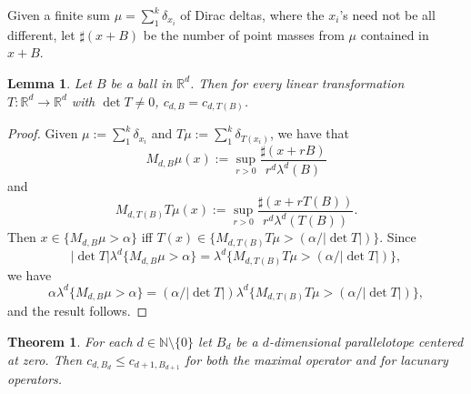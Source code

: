 \documentclass[12pt,a4paper]{amsart}
\theoremstyle{plain}
\newtheorem{thm}{Theorem}
\newtheorem{lem}{Lemma}
\theoremstyle{remark}
\begin{document}
Given a finite sum
$\mu = \sum_1^k \delta_{x_i}$ of Dirac deltas, where
the $x_i$'s need not be all different, let $\sharp (x + B)$ be the number
of point masses from $\mu$ contained in $x + B$.

\begin{lem}
\label{lem:linear}
Let $B$ be a ball in $\mathbb{R}^d$. Then for
every linear transformation $T \colon \mathbb{R}^d \to \mathbb{R}^d$ with
$\det T \ne 0$, $c_{d,B} = c_{d,T(B)}$.
\end{lem}

\begin{proof}
Given $\mu := \sum_1^k \delta_{x_i}$ and
$T \mu := \sum_1^k \delta_{T(x_i)}$, we have that
\[
    M_{d,B} \mu (x) := \sup_{r > 0} \frac{\sharp (x + rB)}{r^d\lambda^d (B)}
\]
and
\[
    M_{d,T(B)} T\mu (x) := \sup_{r > 0}
      \frac{\sharp (x + rT(B))}{r^d\lambda^d (T(B))}.
\]
Then
$x \in \{ M_{d,B} \mu > \alpha \}$
iff
$T(x)\in \{ M_{d,T(B)} T\mu > (\alpha / |\det T|)\}$.
Since
\[
    |\det T| \lambda^d \{ M_{d,B} \mu > \alpha \}
    = \lambda^d \{ M_{d,T(B)} T\mu > (\alpha / |\det T|) \},
\]
we have
\[
    \alpha \lambda^d \{ M_{d,B} \mu > \alpha \}
    = (\alpha / |\det T|) \lambda^d \{ M_{d,T(B)} T\mu
      > (\alpha / |\det T|) \},
\]
and the result follows.
\end{proof}


\begin{thm}
\label{th:ineq}
For each $d \in \mathbb{N} \setminus \{0\}$ let $B_d$ be
a $d$-dimensional parallelotope centered at zero. Then
$c_{d,B_d} \le c_{d+1,B_{d+1}}$ for both the maximal operator
and for lacunary operators.
\end{thm}
\end{document}
